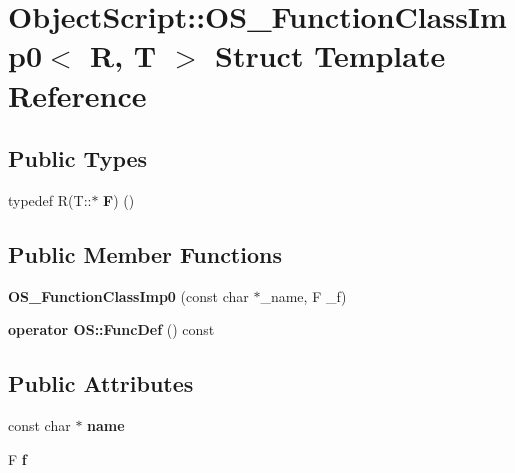 \hypertarget{struct_object_script_1_1_o_s___function_class_imp0}{}\section{Object\+Script\+:\+:O\+S\+\_\+\+Function\+Class\+Imp0$<$ R, T $>$ Struct Template Reference}
\label{struct_object_script_1_1_o_s___function_class_imp0}
\subsection*{Public Types}
\begin{DoxyCompactItemize}
\item 
typedef R(T\+::$\ast$ {\bfseries F}) ()\hypertarget{struct_object_script_1_1_o_s___function_class_imp0_ae9ff8f329e4ab0d5ec8e3e9a62fd12a0}{}\label{struct_object_script_1_1_o_s___function_class_imp0_ae9ff8f329e4ab0d5ec8e3e9a62fd12a0}

\end{DoxyCompactItemize}
\subsection*{Public Member Functions}
\begin{DoxyCompactItemize}
\item 
{\bfseries O\+S\+\_\+\+Function\+Class\+Imp0} (const char $\ast$\+\_\+name, F \+\_\+f)\hypertarget{struct_object_script_1_1_o_s___function_class_imp0_afa233399b8b19d3fd191c3b03e905be5}{}\label{struct_object_script_1_1_o_s___function_class_imp0_afa233399b8b19d3fd191c3b03e905be5}

\item 
{\bfseries operator O\+S\+::\+Func\+Def} () const \hypertarget{struct_object_script_1_1_o_s___function_class_imp0_a15e0c0d2ca1a9b71fc36bed2c6dfb36a}{}\label{struct_object_script_1_1_o_s___function_class_imp0_a15e0c0d2ca1a9b71fc36bed2c6dfb36a}

\end{DoxyCompactItemize}
\subsection*{Public Attributes}
\begin{DoxyCompactItemize}
\item 
const char $\ast$ {\bfseries name}\hypertarget{struct_object_script_1_1_o_s___function_class_imp0_ab6839cb1bd6429e0b9b02c2c40b536d3}{}\label{struct_object_script_1_1_o_s___function_class_imp0_ab6839cb1bd6429e0b9b02c2c40b536d3}

\item 
F {\bfseries f}\hypertarget{struct_object_script_1_1_o_s___function_class_imp0_a5a7250033a91c64746db6e376c0a7381}{}\label{struct_object_script_1_1_o_s___function_class_imp0_a5a7250033a91c64746db6e376c0a7381}

\end{DoxyCompactItemize}


